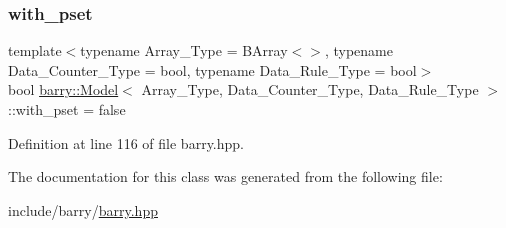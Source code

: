 \subsubsection{\texorpdfstring{with\+\_\+pset}{with\_pset}}
{\footnotesize\ttfamily template$<$typename Array\+\_\+\+Type  = B\+Array$<$$>$, typename Data\+\_\+\+Counter\+\_\+\+Type  = bool, typename Data\+\_\+\+Rule\+\_\+\+Type  = bool$>$ \\
bool \hyperlink{classbarry_1_1_model}{barry\+::\+Model}$<$ Array\+\_\+\+Type, Data\+\_\+\+Counter\+\_\+\+Type, Data\+\_\+\+Rule\+\_\+\+Type $>$\+::with\+\_\+pset = false}



Definition at line 116 of file barry.\+hpp.



The documentation for this class was generated from the following file\+:\begin{DoxyCompactItemize}
\item 
include/barry/\hyperlink{barry_8hpp}{barry.\+hpp}\end{DoxyCompactItemize}
